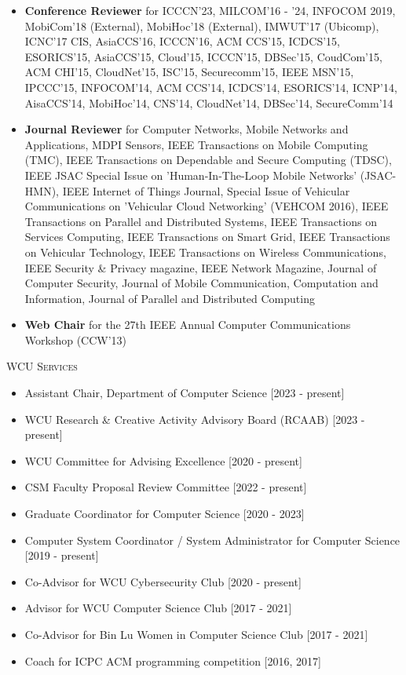 \documentclass[letter]{article}
\newcommand{\heading}[1]{\item \large \textsc{#1} \normalsize}
\begin{document}
\begin{description}
\begin{itemize}
\item \textbf{Conference Reviewer} for ICCCN'23, MILCOM'16 - '24, INFOCOM 2019, MobiCom'18 (External), MobiHoc'18 (External), IMWUT'17 (Ubicomp), ICNC'17 CIS, AsiaCCS'16, ICCCN'16, ACM CCS'15, ICDCS'15, ESORICS'15, AsiaCCS'15, Cloud'15, ICCCN'15, DBSec'15, CoudCom'15, ACM CHI'15, CloudNet'15, ISC'15, Securecomm'15, IEEE MSN'15, IPCCC'15, INFOCOM'14, ACM CCS'14, ICDCS'14, ESORICS'14, ICNP'14, AisaCCS'14, MobiHoc'14, CNS'14, CloudNet'14, DBSec'14, SecureComm'14
\item \textbf{Journal Reviewer} for Computer Networks, Mobile Networks and Applications, MDPI Sensors, IEEE Transactions on Mobile Computing (TMC), IEEE Transactions on Dependable and Secure Computing (TDSC), IEEE JSAC Special Issue on 'Human-In-The-Loop Mobile Networks' (JSAC-HMN), IEEE Internet of Things Journal, Special Issue of Vehicular Communications on 'Vehicular Cloud Networking' (VEHCOM 2016), IEEE Transactions on Parallel and Distributed Systems, IEEE Transactions on Services Computing, IEEE Transactions on Smart Grid, IEEE Transactions on Vehicular Technology, IEEE Transactions on Wireless Communications, IEEE Security \& Privacy magazine, IEEE Network Magazine, Journal of Computer Security, Journal of Mobile Communication, Computation and Information, Journal of Parallel and Distributed Computing
\item \textbf{Web Chair} for the 27th IEEE Annual Computer Communications Workshop (CCW'13)
\end{itemize}

\heading{WCU Services}

\begin{itemize}
\item Assistant Chair, Department of Computer Science [2023 - present]
\item WCU Research \& Creative Activity Advisory Board (RCAAB) [2023 - present]
\item WCU Committee for Advising Excellence [2020 - present]
\item CSM Faculty Proposal Review Committee [2022 - present]
\item Graduate Coordinator for Computer Science [2020 - 2023]
\item Computer System Coordinator / System Administrator for Computer Science [2019 - present]
\item Co-Advisor for WCU Cybersecurity Club [2020 - present]
\item Advisor for WCU Computer Science Club [2017 - 2021]
\item Co-Advisor for Bin Lu Women in Computer Science Club [2017 - 2021]
\item Coach for ICPC ACM programming competition [2016, 2017]
\end{itemize}


\end{description}
\end{document}
